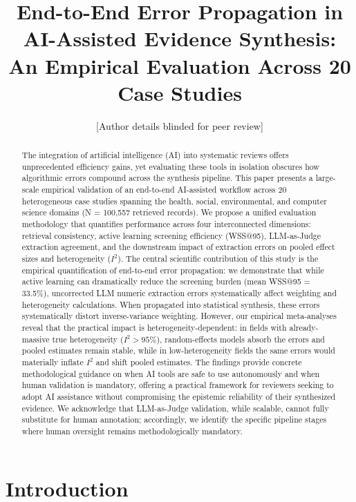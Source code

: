 \documentclass[12pt]{article}
\title{End-to-End Error Propagation in AI-Assisted Evidence Synthesis: An Empirical Evaluation Across 20 Case Studies}
\author{[Author details blinded for peer review]}
\date{}
\begin{document}
\maketitle

\begin{abstract}
The integration of artificial intelligence (AI) into systematic reviews offers unprecedented efficiency gains, yet evaluating these tools in isolation obscures how algorithmic errors compound across the synthesis pipeline. This paper presents a large-scale empirical validation of an end-to-end AI-assisted workflow across 20 heterogeneous case studies spanning the health, social, environmental, and computer science domains (N = 100,557 retrieved records). We propose a unified evaluation methodology that quantifies performance across four interconnected dimensions: retrieval consistency, active learning screening efficiency (WSS@95), LLM-as-Judge extraction agreement, and the downstream impact of extraction errors on pooled effect sizes and heterogeneity ($I^2$). The central scientific contribution of this study is the empirical quantification of end-to-end error propagation: we demonstrate that while active learning can dramatically reduce the screening burden (mean WSS@95 = 33.5\%), uncorrected LLM numeric extraction errors systematically affect weighting and heterogeneity calculations. When propagated into statistical synthesis, these errors systematically distort inverse-variance weighting. However, our empirical meta-analyses reveal that the practical impact is heterogeneity-dependent: in fields with already-massive true heterogeneity ($I^2 > 95\%$), random-effects models absorb the errors and pooled estimates remain stable, while in low-heterogeneity fields the same errors would materially inflate $I^2$ and shift pooled estimates. The findings provide concrete methodological guidance on when AI tools are safe to use autonomously and when human validation is mandatory, offering a practical framework for reviewers seeking to adopt AI assistance without compromising the epistemic reliability of their synthesized evidence. We acknowledge that LLM-as-Judge validation, while scalable, cannot fully substitute for human annotation; accordingly, we identify the specific pipeline stages where human oversight remains methodologically mandatory.
\end{abstract}

\section{Introduction}
\end{document}
